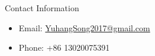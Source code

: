 \documentclass[final]{beamer}
\newlength{\onecolwid}
\begin{document}
\begin{frame}[t]
\begin{columns}[t]
\begin{column}{\onecolwid}





\begin{alertblock}{Contact Information}

\begin{itemize}
\item Email: \href{YuhangSong2017@gmail.com}{YuhangSong2017@gmail.com}
\item Phone: +86 13020075391
\end{itemize}

\end{alertblock}


\end{column} %

\end{columns} %

\end{frame} %
\end{document}
